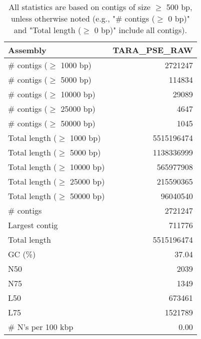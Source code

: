 \documentclass[12pt,a4paper]{article}
\begin{document}
\begin{table}[ht]
\begin{center}
\caption{All statistics are based on contigs of size $\geq$ 500 bp, unless otherwise noted (e.g., "\# contigs ($\geq$ 0 bp)" and "Total length ($\geq$ 0 bp)" include all contigs).}
\begin{tabular}{|l*{1}{|r}|}
\hline
Assembly & TARA\_PSE\_RAW \\ \hline
\# contigs ($\geq$ 1000 bp) & 2721247 \\ \hline
\# contigs ($\geq$ 5000 bp) & 114834 \\ \hline
\# contigs ($\geq$ 10000 bp) & 29089 \\ \hline
\# contigs ($\geq$ 25000 bp) & 4647 \\ \hline
\# contigs ($\geq$ 50000 bp) & 1045 \\ \hline
Total length ($\geq$ 1000 bp) & 5515196474 \\ \hline
Total length ($\geq$ 5000 bp) & 1138336999 \\ \hline
Total length ($\geq$ 10000 bp) & 565977908 \\ \hline
Total length ($\geq$ 25000 bp) & 215590365 \\ \hline
Total length ($\geq$ 50000 bp) & 96040540 \\ \hline
\# contigs & 2721247 \\ \hline
Largest contig & 711776 \\ \hline
Total length & 5515196474 \\ \hline
GC (\%) & 37.04 \\ \hline
N50 & 2039 \\ \hline
N75 & 1349 \\ \hline
L50 & 673461 \\ \hline
L75 & 1521789 \\ \hline
\# N's per 100 kbp & 0.00 \\ \hline
\end{tabular}
\end{center}
\end{table}
\end{document}
